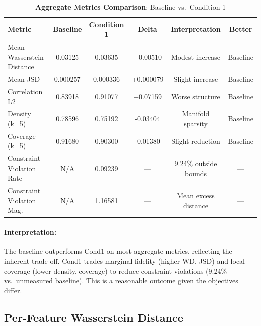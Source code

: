 \documentclass{article}
\begin{document}
\begin{table}[ht]
\centering
\caption{\textbf{Aggregate Metrics Comparison}: Baseline vs.~Condition 1}
\label{tab:main_comparison}
\begin{tabular}{lccccc}
\toprule
Metric & Baseline & Condition 1 & Delta & Interpretation & Better \\
\midrule
Mean Wasserstein Distance & 0.03125 & 0.03635 & +0.00510 & Modest increase & Baseline \\
Mean JSD & 0.000257 & 0.000336 & +0.000079 & Slight increase & Baseline \\
Correlation L2 & 0.83918 & 0.91077 & +0.07159 & Worse structure & Baseline \\
Density (k=5) & 0.78596 & 0.75192 & -0.03404 & Manifold sparsity & Baseline \\
Coverage (k=5) & 0.91680 & 0.90300 & -0.01380 & Slight reduction & Baseline \\
Constraint Violation Rate & N/A & 0.09239 & --- & 9.24\% outside bounds & --- \\
Constraint Violation Mag. & N/A & 1.16581 & --- & Mean excess distance & --- \\
\bottomrule
\end{tabular}
\end{table}

\paragraph{Interpretation:} The baseline outperforms Cond1 on most aggregate metrics, reflecting the inherent trade-off. Cond1 trades marginal fidelity (higher WD, JSD) and local coverage (lower density, coverage) to reduce constraint violations (9.24\% vs.~unmeasured baseline). This is a reasonable outcome given the objectives differ.

\subsection{Per-Feature Wasserstein Distance}
\end{document}
